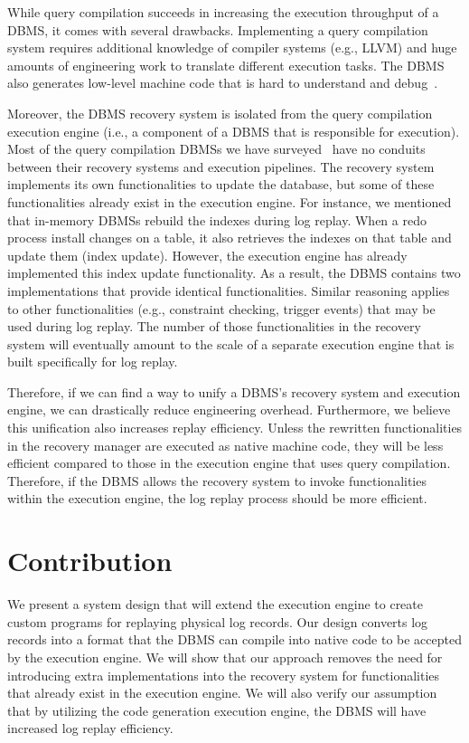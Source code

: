 \documentclass[12pt]{cmuthesis}
\begin{document}
While query compilation succeeds in increasing the execution throughput of a DBMS, it comes with several drawbacks. Implementing a query compilation system requires additional knowledge of compiler systems (e.g., LLVM) and huge amounts of engineering work to translate different execution tasks\cite{kersten18}. The DBMS also generates low-level machine code that is hard to understand and debug~\cite{kersten18}.

Moreover, the DBMS recovery system is isolated from the query compilation execution engine (i.e., a component of a DBMS that is responsible for execution). Most of the query compilation DBMSs we have surveyed~\cite{noisepage, neumann11, paroski16, craig14} have no conduits between their recovery systems and execution pipelines. The recovery system implements its own functionalities to update the database, but some of these functionalities already exist in the execution engine. For instance, we mentioned that in-memory DBMSs rebuild the indexes during log replay. When a redo process install changes on a table, it also retrieves the indexes on that table and update them (index update). However, the execution engine has already implemented this index update functionality. As a result, the DBMS contains two implementations that provide identical functionalities. Similar reasoning applies to other functionalities (e.g., constraint checking, trigger events) that may be used during log replay. The number of those functionalities in the recovery system will eventually amount to the scale of a separate execution engine that is built specifically for log replay.

Therefore, if we can find a way to unify a DBMS's recovery system and execution engine, we can drastically reduce engineering overhead. Furthermore, we believe this unification also increases replay efficiency. Unless the rewritten functionalities in the recovery manager are executed as native machine code, they will be less efficient compared to those in the execution engine that uses query compilation. Therefore, if the DBMS allows the recovery system to invoke functionalities within the execution engine, the log replay process should be more efficient.

\section{Contribution}
We present a system design that will extend the execution engine to create custom programs for replaying physical log records. Our design converts log records into a format that the DBMS can compile into native code to be accepted by the execution engine. We will show that our approach removes the need for introducing extra implementations into the recovery system for functionalities that already exist in the execution engine. We will also verify our assumption that by utilizing the code generation execution engine, the DBMS will have increased log replay efficiency.
\end{document}
